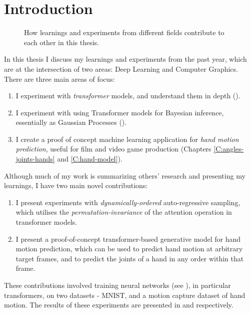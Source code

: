 \chapter{Introduction}
\label{C:intro}

\begin{figure}[t]
\centering
{}
\caption[The relationship between the different fields in this thesis]{How learnings and experiments from different fields contribute to each other in this thesis.}
\end{figure}

In this thesis I discuss my learnings and experiments from the past year, which are at the intersection of two areas: Deep Learning and Computer Graphics. There are three main areas of focus:
\begin{enumerate}
    \item I experiment with \textit{transformer} models, and understand them in depth ().
    \item I experiment with using Transformer models for Bayesian inference, essentially as Gaussian Processes ().
    \item I create a proof of concept machine learning application for \textit{hand motion prediction}, useful for film and video game production (Chapters \ref{C:angles-joints-hands} and \ref{C:hand-model}).
\end{enumerate}

Although much of my work is summarizing others' research and presenting my learnings, I have two main novel contributions:
\begin{enumerate}
    \item I present experiments with \textit{dynamically-ordered} auto-regressive sampling, which utilises the \textit{permutation-invariance} of the attention operation in transformer models.
    \item I present a proof-of-concept transformer-based generative model for hand motion prediction, which can be used to predict hand motion at arbitrary target frames, and to predict the joints of a hand in any order within that frame.
\end{enumerate}
These contributions involved training neural networks (see ), in particular transformers, on two datasets - MNIST, and a motion capture dataset of hand motion. The results of these experiments are presented in  and  respectively.

